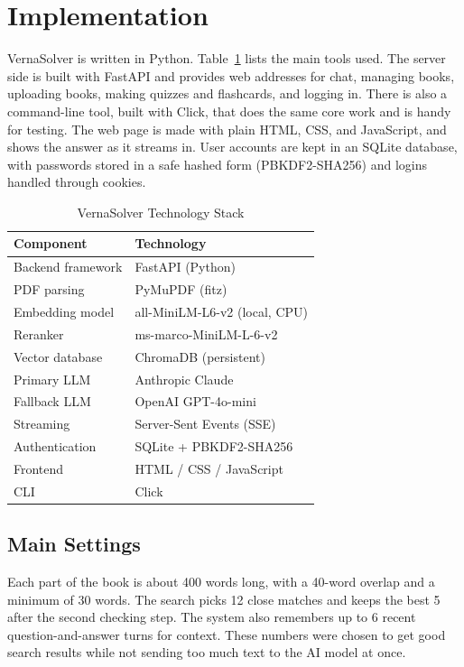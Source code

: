 \documentclass[conference]{IEEEtran}
\begin{document}
\section{Implementation}
VernaSolver is written in Python. Table~\ref{tab:stack} lists the main
tools used. The server side is built with FastAPI and provides web
addresses for chat, managing books, uploading books, making quizzes and
flashcards, and logging in. There is also a command-line tool, built with
Click, that does the same core work and is handy for testing. The web
page is made with plain HTML, CSS, and JavaScript, and shows the answer
as it streams in. User accounts are kept in an SQLite database, with
passwords stored in a safe hashed form (PBKDF2-SHA256) and logins handled
through cookies.

\begin{table}[!t]
\caption{VernaSolver Technology Stack}
\label{tab:stack}
\centering
\renewcommand{\arraystretch}{1.25}
\begin{tabular}{@{}ll@{}}
\toprule
\textbf{Component} & \textbf{Technology} \\
\midrule
Backend framework   & FastAPI (Python) \\
PDF parsing         & PyMuPDF (fitz) \\
Embedding model     & all-MiniLM-L6-v2 (local, CPU) \\
Reranker            & ms-marco-MiniLM-L-6-v2 \\
Vector database     & ChromaDB (persistent) \\
Primary LLM         & Anthropic Claude \\
Fallback LLM        & OpenAI GPT-4o-mini \\
Streaming           & Server-Sent Events (SSE) \\
Authentication      & SQLite + PBKDF2-SHA256 \\
Frontend            & HTML / CSS / JavaScript \\
CLI                 & Click \\
\bottomrule
\end{tabular}
\end{table}

\subsection{Main Settings}
Each part of the book is about 400 words long, with a 40-word overlap and
a minimum of 30 words. The search picks 12 close matches and keeps the
best 5 after the second checking step. The system also remembers up to 6
recent question-and-answer turns for context. These numbers were chosen
to get good search results while not sending too much text to the AI
model at once.
\end{document}
